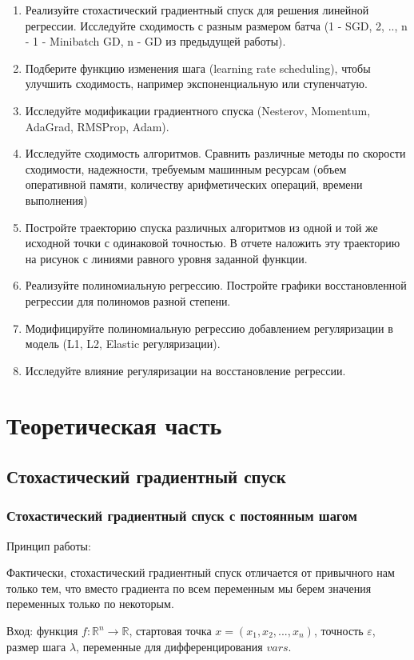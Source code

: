 \documentclass[a4paper,14pt,oneside,openany]{memoir}
\begin{document}
\begin{enumerate}
\item Реализуйте стохастический градиентный спуск для решения линейной регрессии. Исследуйте сходимость с разным размером батча (1 - SGD, 2, .., n - 1 - Minibatch GD, n - GD из предыдущей работы). 
\item 
	Подберите функцию изменения шага (learning rate scheduling), чтобы улучшить
	сходимость, например экспоненциальную или ступенчатую.
	\item Исследуйте модификации градиентного спуска (Nesterov, Momentum, AdaGrad,
	RMSProp, Adam).
	\item Исследуйте сходимость алгоритмов. Сравнить различные методы по скорости
	сходимости, надежности, требуемым машинным ресурсам (объем оперативной
	памяти, количеству арифметических операций, времени выполнения)
	\item Постройте траекторию спуска различных алгоритмов из одной и той же исходной точки с одинаковой точностью. В отчете наложить эту траекторию на рисунок с линиями равного уровня заданной функции.
	\item Реализуйте полиномиальную регрессию. Постройте графики восстановленной
	регрессии для полиномов разной степени.
	\item Модифицируйте полиномиальную регрессию добавлением регуляризации в модель (L1, L2, Elastic регуляризации).
	\item Исследуйте влияние регуляризации на восстановление регрессии.
\end{enumerate}

\chapter{Теоретическая часть}
\section{Стохастический градиентный спуск}
\subsection{Стохастический градиентный спуск с постоянным шагом}

Принцип работы: 

Фактически, стохастический градиентный спуск отличается от привычного нам только тем, что вместо градиента по всем переменным мы берем значения переменных только по некоторым.

Вход: функция $f:\mathbb{R}^n \rightarrow \mathbb{R}$, стартовая точка $x = (x_1,x_2,...,x_n)$, точность $\varepsilon$, размер шага $\lambda$, переменные для дифференцирования $vars$.
\end{document}
